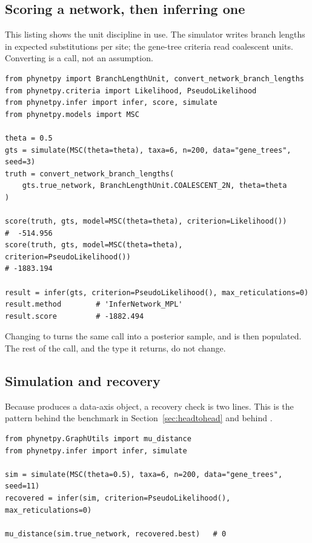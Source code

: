 \subsection{Scoring a network, then inferring one}

This listing shows the unit discipline in use. The simulator writes branch
lengths in expected substitutions per site; the gene-tree criteria read
coalescent units. Converting is a call, not an assumption.

\begin{lstlisting}
from phynetpy import BranchLengthUnit, convert_network_branch_lengths
from phynetpy.criteria import Likelihood, PseudoLikelihood
from phynetpy.infer import infer, score, simulate
from phynetpy.models import MSC

theta = 0.5
gts = simulate(MSC(theta=theta), taxa=6, n=200, data="gene_trees", seed=3)
truth = convert_network_branch_lengths(
    gts.true_network, BranchLengthUnit.COALESCENT_2N, theta=theta
)

score(truth, gts, model=MSC(theta=theta), criterion=Likelihood())
#  -514.956
score(truth, gts, model=MSC(theta=theta), criterion=PseudoLikelihood())
# -1883.194

result = infer(gts, criterion=PseudoLikelihood(), max_reticulations=0)
result.method        # 'InferNetwork_MPL'
result.score         # -1882.494
\end{lstlisting}

Changing  to  turns the same call into a
posterior sample, and  is then populated. The rest of the
call, and the type it returns, do not change.

\subsection{Simulation and recovery}

Because  produces a data-axis object, a recovery check is two
lines. This is the pattern behind the benchmark in
Section~\ref{sec:headtohead} and behind .

\begin{lstlisting}
from phynetpy.GraphUtils import mu_distance
from phynetpy.infer import infer, simulate

sim = simulate(MSC(theta=0.5), taxa=6, n=200, data="gene_trees", seed=11)
recovered = infer(sim, criterion=PseudoLikelihood(), max_reticulations=0)

mu_distance(sim.true_network, recovered.best)   # 0
\end{lstlisting}

